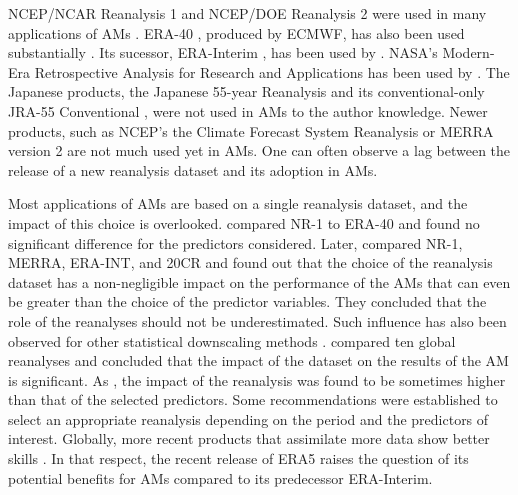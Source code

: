 \documentclass[alpha-refs]{wiley-article}
\begin{document}
NCEP/NCAR Reanalysis 1 \citep[NR-1 --][]{Kalnay1996, Kistler2001} and NCEP/DOE Reanalysis 2 \citep[NR-2 --][]{Kanamitsu2002} were used in many applications of AMs \citep{Timbal2003, Bontron2004, Wetterhall2005a, Gangopadhyay2005, Altava-Ortiz2006, Barrera2007, Cannon2007, Matulla2007, Bliefernicht2007, Maurer2008, BenDaoud2009, Wu2012, Marty2012, Teng2012, Horton2012, Yiou2014}. ERA-40 \citep{Uppala2005}, produced by ECMWF, has also been used substantially \citep {BenDaoud2009, Willems2011b, JakobThemessl2011a, BenDaoud2011, Turco2011a, Franke2011, Pascual2012b, Schenk2012, Ribalaygua2013a, Osca2013, Radanovics2013, Martin2014b, Chardon2014, BenDaoud2016}. Its sucessor, ERA-Interim \citep[ERA-INT --][]{Dee2011a}, has been used by \cite{Raynaud2016b}. NASA's Modern-Era Retrospective Analysis for Research and Applications \citep[MERRA -- ][]{Rienecker2011} has been used by \citet{Vanvyve2015}. The Japanese products, the Japanese 55-year Reanalysis \citep[JRA-55 --][]{Kobayashi2015, Harada2016} and its conventional-only JRA-55 Conventional \citep[JRA-55C --][]{Kobayashi2014}, were not used in AMs to the author knowledge. Newer products, such as NCEP's the Climate Forecast System Reanalysis \citep[CFSR --][]{Saha2010a} or MERRA version 2 \citep[MERRA-2 -- ][]{Gelaro2017} are not much used yet in AMs. One can often observe a lag between the release of a new reanalysis dataset and its adoption in AMs.

Most applications of AMs are based on a single reanalysis dataset, and the impact of this choice is overlooked. \citet{BenDaoud2009} compared NR-1 to ERA-40 and found no significant difference for the predictors considered. Later, \citet{Dayon2015} compared NR-1, MERRA, ERA-INT, and 20CR and found out that the choice of the reanalysis dataset has a non-negligible impact on the performance of the AMs that can even be greater than the choice of the predictor variables. They concluded that the role of the reanalyses should not be underestimated. Such influence has also been observed for other statistical downscaling methods \citep[e.g.][]{Koukidis2009}. \citet{Horton2018b} compared ten global reanalyses and concluded that the impact of the dataset on the results of the AM is significant. As \citet{Dayon2015}, the impact of the reanalysis was found to be sometimes higher than that of the selected predictors. Some recommendations were established to select an appropriate reanalysis depending on the period and the predictors of interest. Globally, more recent products that assimilate more data show better skills \citep{Horton2018b}. In that respect, the recent release of ERA5 \citep{Hersbach2019} raises the question of its potential benefits for AMs compared to its predecessor ERA-Interim.
\end{document}
